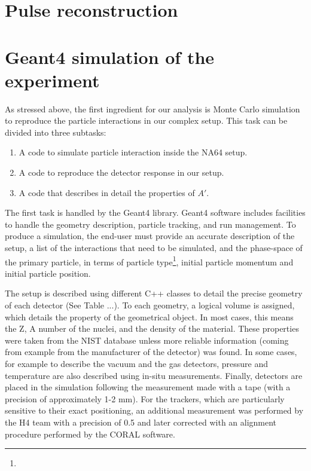 \section{Pulse reconstruction}
\label{ch3:sec:pulse-reconstruction}

\section{Geant4 simulation of the experiment}
\label{ch3:sec:geant4}

As stressed above, the first ingredient for our analysis is Monte Carlo simulation to reproduce the particle interactions in our complex setup. This task can be divided into three subtasks:

\begin{enumerate}
\item A code to simulate particle interaction inside the NA64 setup.
\item A code to reproduce the detector response in our setup.  
\item A code that describes in detail the properties of $A'$.
\end{enumerate}

The first task is handled by the Geant4 library\cite{AGOSTINELLI2003250}. Geant4 software includes facilities to handle the geometry description, particle tracking, and run management. To produce a simulation, the end-user must provide an accurate description of the setup, a list of the interactions that need to be simulated, and the phase-space of the primary particle, in terms of particle type\footnote{}, initial particle momentum and initial particle position.

The setup is described using different C++ classes to detail the precise geometry of each detector (See Table ...). To each geometry, a logical volume is assigned, which details the property of the geometrical object. In most cases, this means the Z, A number of the nuclei, and the density of the material. These properties were taken from the NIST database \cite{nist-database} unless more reliable information (coming from example from the manufacturer of the detector) was found. In some cases, for example to describe the vacuum and the gas detectors, pressure and temperature are also described using in-situ measurements. Finally, detectors are placed in the simulation following the measurement made with a tape (with a precision of approximately 1-2 mm). For the trackers, which are particularly sensitive to their exact positioning, an additional measurement was performed by the H4 team with a precision of 0.5 \mmi\cite{meterology-measurements} and later corrected with an alignment procedure performed by the CORAL software\cite{ABBON2007455}.

